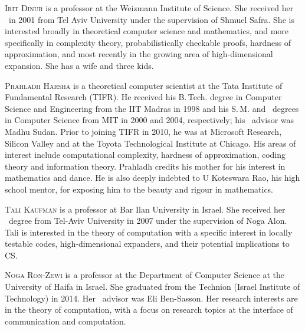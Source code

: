 \documentclass{toc}
\theoremstyle{plain}
\begin{document}
%
%
%
%
%
%
%
%
%
%
%
%
%
%
\begin{tocaboutauthors}

\begin{tocabout}[dinur]
  \textsc{Irit Dinur} is a professor at the Weizmann Institute of Science.
%
She received her \phd\ in 2001 from Tel Aviv University  
under the supervision of Shmuel Safra.  %
She is interested broadly in theoretical computer science and mathematics, and more specifically in complexity theory, probabilistically checkable proofs, hardness of approximation, and most recently in the growing area of
high-dimensional expansion. 
She has a wife and three kids.   
\end{tocabout}

\begin{tocabout}[harsha]
  \textsc{Prahladh Harsha} is a theoretical computer scientist at the Tata Institute of Fundamental Research (TIFR). He received his B.\,Tech. degree in Computer Science and Engineering from the IIT Madras in 1998 and his S.\,M.
and \phd\ degrees in Computer Science from MIT in 2000 and 2004, respectively;
his \phd\ advisor was Madhu Sudan.  %
Prior to joining TIFR in 2010, he was at Microsoft Research, Silicon Valley and at the Toyota Technological Institute at Chicago. His areas of interest include
computational complexity, hardness of approximation, coding theory and information theory. Prahladh credits his mother for his interest in mathematics and dance. He is also deeply indebted to U Koteswara Rao, his high school mentor, for exposing him to %
%
%
the beauty and rigour in mathematics.
\end{tocabout}

\begin{tocabout}[kaufman]  %
\textsc{Tali Kaufman} is a professor at Bar Ilan
%
University %
in Israel.
She received her \phd\ degree from Tel-Aviv University in 2007
under the supervision of %
%
%
Noga Alon. %
Tali is interested in
the  %
theory of computation with a specific interest
in locally testable codes, %
high-dimensional  %
expanders, and their potential implications to CS.
\end{tocabout}

\begin{tocabout}[ronzewi]  %
  \textsc{Noga Ron-Zewi} is a professor at the Department of Computer Science at the University of Haifa in Israel.  
She graduated from the Technion (Israel Institute of Technology) in 2014.
Her \phd\ advisor was Eli Ben-Sasson.  %
Her research interests are in the theory of computation, with a focus on research topics at the interface of communication and computation. 
\end{tocabout}

\end{tocaboutauthors}
\end{document}
